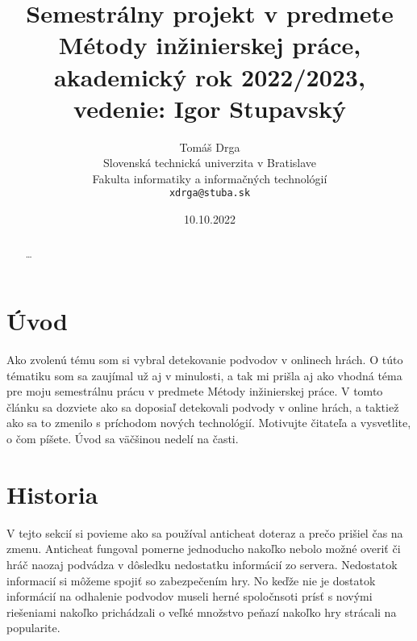 \documentclass[10pt,twoside,slovak,a4paper]{article}
\title{Semestrálny projekt v predmete Métody inžinierskej práce, akademický rok 2022/2023, vedenie: Igor Stupavský}
\author{Tomáš Drga\\[2pt]
	{\small Slovenská technická univerzita v Bratislave}\\
	{\small Fakulta informatiky a informačných technológií}\\
	{\small \texttt{xdrga@stuba.sk}}
	}
\date{\small 10.10.2022}
\begin{document}
\maketitle

\begin{abstract}
\ldots
\end{abstract}

\section{Úvod}

Ako zvolenú tému som si vybral detekovanie podvodov v onlinech hrách. O túto tématiku som sa zaujímal už aj v minulosti, a tak mi prišla aj ako vhodná téma pre moju semestrálnu prácu v predmete Métody inžinierskej práce. V tomto článku sa dozviete ako sa doposiaľ detekovali podvody v online hrách, a taktiež ako sa to zmenilo s príchodom nových technológií.
Motivujte čitateľa a vysvetlite, o čom píšete. Úvod sa väčšinou nedelí na časti.

\section{Historia}

V tejto sekcií si povieme ako sa používal anticheat doteraz a prečo prišiel čas na zmenu. Anticheat fungoval pomerne jednoducho nakoľko nebolo možné overiť či hráč naozaj podvádza v dôsledku nedostatku informácií zo servera. Nedostatok informacií si môžeme spojiť so zabezpečením hry. No keďže nie je dostatok informácií na odhalenie podvodov museli herné spoločnsoti prísť s novými riešeniami nakoľko prichádzali o veľké množstvo peňazí nakoľko hry strácali na popularite.
\end{document}
